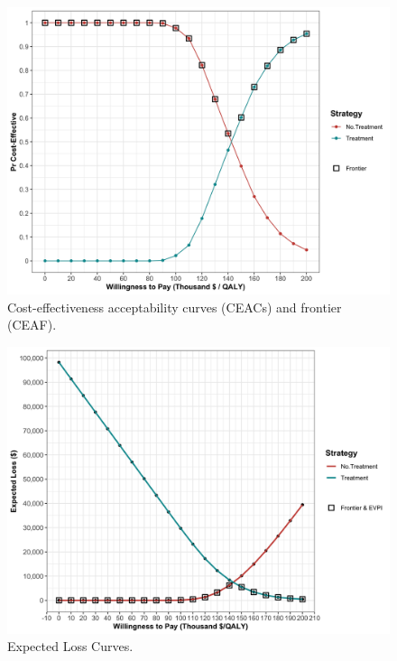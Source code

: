 \documentclass[]{book}
\begin{document}
\begin{figure}

{\centering \includegraphics[width=1\linewidth]{../figs/05b_ceac_ceaf} 

}

\caption{Cost-effectiveness acceptability curves (CEACs) and frontier (CEAF).}\label{fig:05b-ceac-ceaf}
\end{figure}

\begin{figure}

{\centering \includegraphics[width=1\linewidth]{../figs/05b_elc} 

}

\caption{Expected Loss Curves.}\label{fig:05b-elc}
\end{figure}
\end{document}
